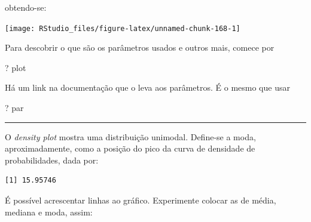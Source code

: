 \documentclass[
]{article}
\newenvironment{Shaded}{\begin{snugshade}}{\end{snugshade}}
\newcommand{\FunctionTok}[1]{\textcolor[rgb]{0.00,0.00,0.00}{#1}}
\newcommand{\NormalTok}[1]{#1}
\newcommand{\SpecialCharTok}[1]{\textcolor[rgb]{0.00,0.00,0.00}{#1}}
\begin{document}
obtendo-se:

\begin{center}\texttt{[image: RStudio\_files/figure-latex/unnamed-chunk-168-1]} \end{center}

Para descobrir o que são os parâmetros usados e outros mais, comece por

\begin{Shaded}
\begin{Highlighting}[]
\NormalTok{? plot}
\end{Highlighting}
\end{Shaded}

Há um link na documentação que o leva aos parâmetros. É o mesmo que usar

\begin{Shaded}
\begin{Highlighting}[]
\NormalTok{? par}
\end{Highlighting}
\end{Shaded}

\begin{center}\rule{0.5\linewidth}{0.5pt}\end{center}

O \emph{density plot} mostra uma distribuição unimodal. Define-se a
moda, aproximadamente, como a posição do pico da curva de densidade de
probabilidades, dada por:

\begin{Shaded}
\end{Shaded}

\begin{verbatim}
[1] 15.95746
\end{verbatim}

É possível acrescentar linhas ao gráfico. Experimente colocar as de
média, mediana e moda, assim:
\end{document}
